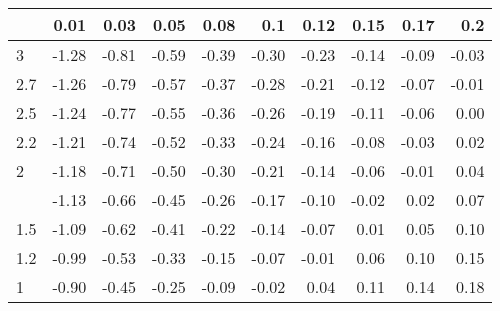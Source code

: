 
\begin{tabular}{lrrrrrrrrr}
\toprule
  & 0.01 & 0.03 & 0.05 & 0.08 & 0.1 & 0.12 & 0.15 & 0.17 & 0.2\\
\midrule
3 & -1.28 & -0.81 & -0.59 & -0.39 & -0.30 & -0.23 & -0.14 & -0.09 & -0.03\\
2.7 & -1.26 & -0.79 & -0.57 & -0.37 & -0.28 & -0.21 & -0.12 & -0.07 & -0.01\\
2.5 & -1.24 & -0.77 & -0.55 & -0.36 & -0.26 & -0.19 & -0.11 & -0.06 & 0.00\\
2.2 & -1.21 & -0.74 & -0.52 & -0.33 & -0.24 & -0.16 & -0.08 & -0.03 & 0.02\\
2 & -1.18 & -0.71 & -0.50 & -0.30 & -0.21 & -0.14 & -0.06 & -0.01 & 0.04\\
\addlinespace
1.7 & -1.13 & -0.66 & -0.45 & -0.26 & -0.17 & -0.10 & -0.02 & 0.02 & 0.07\\
1.5 & -1.09 & -0.62 & -0.41 & -0.22 & -0.14 & -0.07 & 0.01 & 0.05 & 0.10\\
1.2 & -0.99 & -0.53 & -0.33 & -0.15 & -0.07 & -0.01 & 0.06 & 0.10 & 0.15\\
1 & -0.90 & -0.45 & -0.25 & -0.09 & -0.02 & 0.04 & 0.11 & 0.14 & 0.18\\
\bottomrule
\end{tabular}
